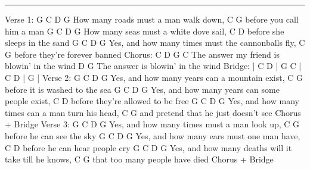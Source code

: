 \noindent\rule{\columnwidth}{1pt}

\begin{lstsong}
Verse 1:
G        C            D        G
How many roads must a man walk down,
           C          G
before you call him a man
G        C           D          G
How many seas must a white dove sail,
           C             D
before she sleeps in the sand
         G        C              D           G
Yes, and how many times must the cannonballs fly,
               C       G
before they're forever banned
Chorus:
C            D        G                C
The answer my friend is blowin' in the wind
              D              G
The answer is blowin' in the wind
Bridge: | C  D  | G  C  | C  D  | G     |
Verse 2:
         G        C           D         G
Yes, and how many years can a mountain exist,
             C             G
before it is washed to the sea
         G        C              D      G
Yes, and how many years can some people exist,
               C             D
before they're allowed to be free
         G        C           D            G
Yes, and how many times can a man turn his head,
                     C           G
and pretend that he just doesn't see
Chorus + Bridge
Verse 3:
         G        C            D        G
Yes, and how many times must a man look up,
              C       G
before he can see the sky
         G        C         D       G
Yes, and how many ears must one man have,
              C           D
before he can hear people cry
         G        C              D            G
Yes, and how many deaths will it take till he knows,
              C           G
that too many people have died
Chorus + Bridge
\end{lstsong}
\newpage


